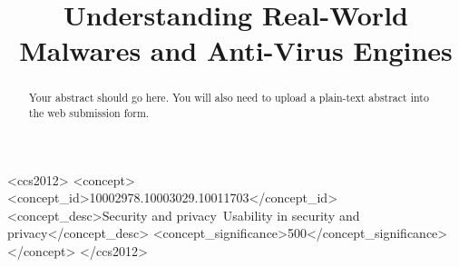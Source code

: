 \documentclass[sigconf, anonymous]{acmart}
\begin{document}
	\newcommand{\vt}{VirusTotal}
\title{Understanding Real-World Malwares and Anti-Virus Engines}%

\begin{abstract}
Your abstract should go here. You will also need to upload a plain-text abstract into the web submission form.
\end{abstract}

\begin{CCSXML}
<ccs2012>
<concept>
<concept_id>10002978.10003029.10011703</concept_id>
<concept_desc>Security and privacy~Usability in security and privacy</concept_desc>
<concept_significance>500</concept_significance>
</concept>
</ccs2012>
\end{CCSXML}



\maketitle













\end{document}
